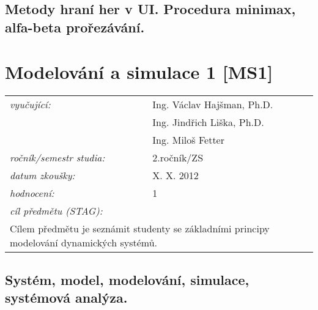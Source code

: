 \newpage
\subsection{Metody hraní her v UI. Procedura minimax, alfa-beta prořezávání.}

\newpage
\section{Modelování a simulace 1 [MS1]}

\begin{table}[H]
\centering
\begin{tabular}{p{4cm} p{12cm}}
\textit{vyučující:}             & Ing. Václav Hajšman, Ph.D. \\
								 & Ing. Jindřich Liška, Ph.D. \\
								 & Ing. Miloš Fetter \\
\textit{ročník/semestr studia:} & 2.ročník/ZS \\
\textit{datum zkoušky:}         & X. X. 2012 \\
\textit{hodnocení:}             & 1 \\
\textit{cíl předmětu (STAG):}   & \\
\multicolumn{2}{p{16cm}}{Cílem předmětu je seznámit studenty se základními principy modelování dynamických systémů.}
\end{tabular}
\end{table}

\subsection{Systém, model, modelování, simulace, systémová analýza.}
